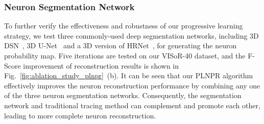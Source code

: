 

\subsubsection{Neuron Segmentation Network}

To further verify the effectiveness and robustness of our progressive learning strategy, we test three commonly-used deep segmentation networks, including 3D DSN~\cite{Dou2017}, 3D U-Net~\cite{Cicek2016} and a 3D version of HRNet~\cite{Sun2019}, for generating the neuron probability map.
Five iterations are tested on our VISoR-40 dataset, and the F-Score improvement of reconstruction results is shown in Fig.~\ref{fig:ablation_study_plnpr}~(b). 
%
It can be seen that our PLNPR algorithm effectively improves the neuron reconstruction performance by combining any one of the three neuron segmentation networks.
Consequently, the segmentation network and traditional tracing method can complement and promote each other, leading to more complete neuron reconstruction.


